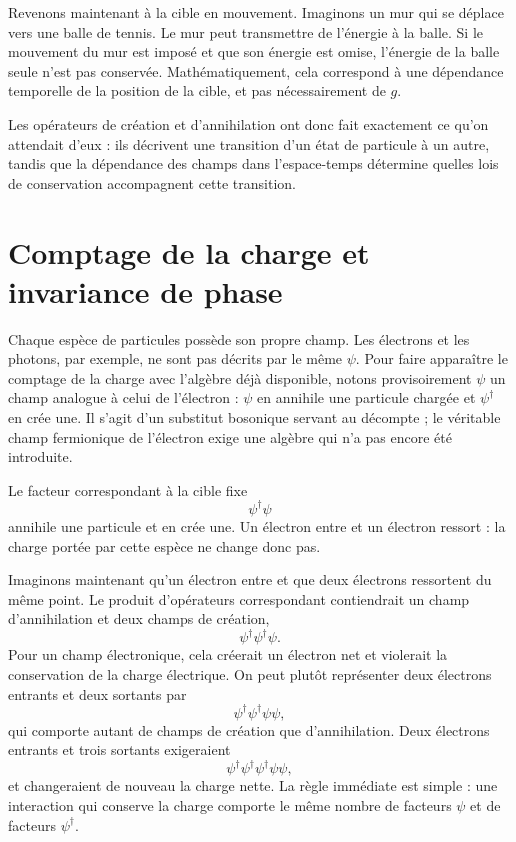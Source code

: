 Revenons maintenant à la cible en mouvement. Imaginons un mur qui se déplace vers une balle de tennis. Le mur peut transmettre de l’énergie à la balle. Si le mouvement du mur est imposé et que son énergie est omise, l’énergie de la balle seule n’est pas conservée. Mathématiquement, cela correspond à une dépendance temporelle de la position de la cible, et pas nécessairement de \(g\).

Les opérateurs de création et d’annihilation ont donc fait exactement ce qu’on attendait d’eux : ils décrivent une transition d’un état de particule à un autre, tandis que la dépendance des champs dans l’espace-temps détermine quelles lois de conservation accompagnent cette transition.

\section{Comptage de la charge et invariance de phase}

Chaque espèce de particules possède son propre champ. Les électrons et les photons, par exemple, ne sont pas décrits par le même \(\psi\). Pour faire apparaître le comptage de la charge avec l’algèbre déjà disponible, notons provisoirement \(\psi\) un champ analogue à celui de l’électron : \(\psi\) en annihile une particule chargée et \(\psi^\dagger\) en crée une. Il s’agit d’un substitut bosonique servant au décompte ; le véritable champ fermionique de l’électron exige une algèbre qui n’a pas encore été introduite.

Le facteur correspondant à la cible fixe
\begin{equation}
\psi^\dagger\psi
\end{equation}
annihile une particule et en crée une. Un électron entre et un électron ressort : la charge portée par cette espèce ne change donc pas.

Imaginons maintenant qu’un électron entre et que deux électrons ressortent du même point. Le produit d’opérateurs correspondant contiendrait un champ d’annihilation et deux champs de création,
\begin{equation}
\psi^\dagger\psi^\dagger\psi.
\end{equation}
Pour un champ électronique, cela créerait un électron net et violerait la conservation de la charge électrique. On peut plutôt représenter deux électrons entrants et deux sortants par
\begin{equation}
\psi^\dagger\psi^\dagger\psi\psi,
\end{equation}
qui comporte autant de champs de création que d’annihilation. Deux électrons entrants et trois sortants exigeraient
\begin{equation}
\psi^\dagger\psi^\dagger\psi^\dagger\psi\psi,
\end{equation}
et changeraient de nouveau la charge nette. La règle immédiate est simple : une interaction qui conserve la charge comporte le même nombre de facteurs \(\psi\) et de facteurs \(\psi^\dagger\).

